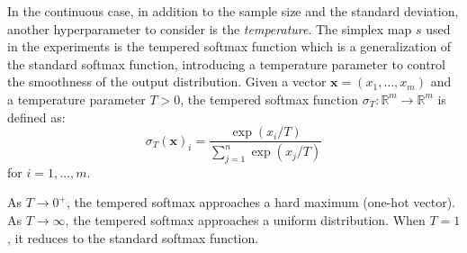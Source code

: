 In the continuous case, in addition to the sample size and the standard deviation, another hyperparameter to consider is the \textit{temperature}.
The simplex map $s$ used in the experiments is the tempered softmax function which is a generalization of the standard softmax function, introducing a temperature parameter to control the smoothness of the output distribution.
Given a vector $\mathbf{x} = (x_1, \ldots, x_m)$ and a temperature parameter $T > 0$, the tempered softmax function $\sigma_T: \mathbb{R}^m \to \mathbb{R}^m$ is defined as:
\[
    \sigma_T(\mathbf{x})_i = \frac{\exp(x_i/T)}{\sum_{j=1}^n \exp(x_j/T)}
\]
for $i = 1, \ldots, m$.

As $T \to 0^+$, the tempered softmax approaches a hard maximum (one-hot vector).
As $T \to \infty$, the tempered softmax approaches a uniform distribution.
When $T = 1$, it reduces to the standard softmax function.

